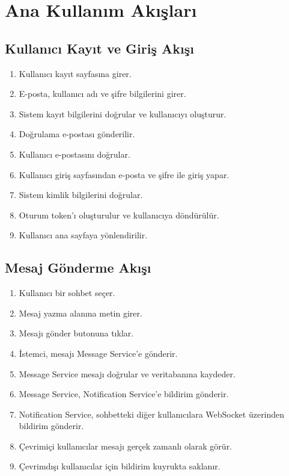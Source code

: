 \section{Ana Kullanım Akışları}

\subsection{Kullanıcı Kayıt ve Giriş Akışı}
\begin{enumerate}
    \item Kullanıcı kayıt sayfasına girer.
    \item E-posta, kullanıcı adı ve şifre bilgilerini girer.
    \item Sistem kayıt bilgilerini doğrular ve kullanıcıyı oluşturur.
    \item Doğrulama e-postası gönderilir.
    \item Kullanıcı e-postasını doğrular.
    \item Kullanıcı giriş sayfasından e-posta ve şifre ile giriş yapar.
    \item Sistem kimlik bilgilerini doğrular.
    \item Oturum token'ı oluşturulur ve kullanıcıya döndürülür.
    \item Kullanıcı ana sayfaya yönlendirilir.
\end{enumerate}

\subsection{Mesaj Gönderme Akışı}
\begin{enumerate}
    \item Kullanıcı bir sohbet seçer.
    \item Mesaj yazma alanına metin girer.
    \item Mesajı gönder butonuna tıklar.
    \item İstemci, mesajı Message Service'e gönderir.
    \item Message Service mesajı doğrular ve veritabanına kaydeder.
    \item Message Service, Notification Service'e bildirim gönderir.
    \item Notification Service, sohbetteki diğer kullanıcılara WebSocket üzerinden bildirim gönderir.
    \item Çevrimiçi kullanıcılar mesajı gerçek zamanlı olarak görür.
    \item Çevrimdışı kullanıcılar için bildirim kuyrukta saklanır.
\end{enumerate}


